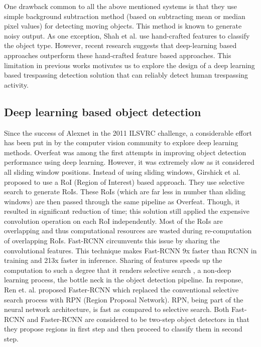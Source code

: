 One drawback common to all the above mentioned systems is that they use simple background subtraction method (based on subtracting mean or median pixel values) for detecting moving objects. This method is known to generate noisy output\cite{stauffer1999adaptive}. As one exception, Shah et al.\cite{shah2007automated} use hand-crafted features to classify the object type. However, recent research suggests that deep-learning based approaches outperform these hand-crafted feature based approaches\cite{benenson2014ten}. This limitation in previous works motivates us to explore the design of a deep learning based trespassing detection solution that can reliably detect human trespassing activity. 

\subsection{Deep learning based object detection}
Since the success of Alexnet\cite{krizhevsky2012imagenet} in the 2011 ILSVRC\cite{russakovsky2015imagenet} challenge, a considerable effort has been put in by the computer vision community to explore deep learning methods. Overfeat\cite{sermanet2013overfeat} was among the first attempts in improving object detection performance using deep learning. However, it was extremely slow as it considered all sliding window positions. Instead of using sliding windows, Girshick et al.\cite{girshick2014rich} proposed to use a RoI (Region of Interest) based approach. They use selective search\cite{uijlings2013selective} to generate RoIs. These RoIs (which are far less in number than sliding windows) are then passed through the same pipeline as Overfeat.  Though, it resulted in significant reduction of time; this solution still applied the expensive convolution operation on each RoI independently. Most of the RoIs are overlapping and thus computational resources are wasted during re-computation of overlapping RoIs. Fast-RCNN\cite{girshick2015fast} circumvents this issue by sharing the convolutional features. This technique makes Fast-RCNN 9x faster than RCNN\cite{girshick2014rich} in training and 213x faster in inference\cite{girshick2015fast}. Sharing of features speeds up the computation to such a degree that it renders selective search \cite{uijlings2013selective}, a non-deep learning process, the bottle neck in the object detection pipeline. In response, Ren et. al. proposed Faster-RCNN\cite{ren2015faster} which replaced the conventional selective search process with RPN (Region Proposal Network). RPN, being part of the neural network architecture, is fast as compared to selective search. Both Fast-RCNN and Faster-RCNN are considered to be two-step object detectors in that they propose regions in first step and then proceed to classify them in second step.

